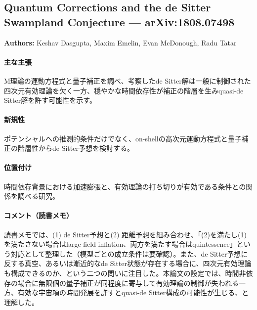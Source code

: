 \subsection{Quantum Corrections and the de Sitter Swampland Conjecture --- arXiv:1808.07498}

\textbf{Authors:} Keshav Dasgupta, Maxim Emelin, Evan McDonough, Radu Tatar

\paragraph{主な主張}
M理論の運動方程式と量子補正を調べ、考察したde Sitter解は一般に制御された四次元有効理論を欠く一方、穏やかな時間依存性が補正の階層を生みquasi-de Sitter解を許す可能性を示す\cite{Dasgupta:2018rtp}。

\paragraph{新規性}
ポテンシャルへの推測的条件だけでなく、on-shellの高次元運動方程式と量子補正の階層性からde Sitter予想を検討する。

\paragraph{位置付け}
時間依存背景における加速膨張と、有効理論の打ち切りが有効である条件との関係を調べる研究。

\paragraph{コメント（読書メモ）}
読書メモでは、(1) de Sitter予想と(2) 距離予想を組み合わせ、「(2)を満たし(1)を満たさない場合はlarge-field inflation、両方を満たす場合はquintessence」という対応として整理した（模型ごとの成立条件は要確認）。また、de Sitter予想に反する真空、あるいは漸近的なde Sitter状態が存在する場合に、四次元有効理論も構成できるのか、という二つの問いに注目した。本論文の設定では、時間非依存の場合に無限個の量子補正が同程度に寄与して有効理論の制御が失われる一方、有効な宇宙項の時間発展を許すとquasi-de Sitter構成の可能性が生じる、と理解した。
